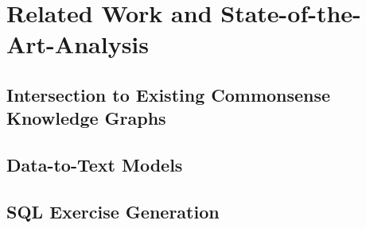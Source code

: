 \chapter{Related Work and State-of-the-Art-Analysis}
\label{ch:rel}

\section{Intersection to Existing Commonsense Knowledge Graphs}
\label{sec:rel:commonsense}

\section{Data-to-Text Models}
\label{sec:rel:rdf}

\section{SQL Exercise Generation}
\label{sec:rel:sql}

